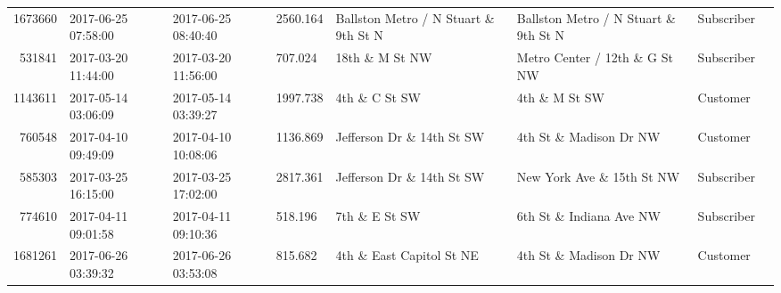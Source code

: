 \documentclass[11pt]{article}
\begin{document}
\begin{description}
\begin{tabular}{r|lllllll}
	 1673660                                            & 2017-06-25 07:58:00                                & 2017-06-25 08:40:40                                & 2560.164                                           & Ballston Metro / N Stuart \& 9th St N             & Ballston Metro / N Stuart \& 9th St N             & Subscriber                                        \\
	  531841                                            & 2017-03-20 11:44:00                                & 2017-03-20 11:56:00                                &  707.024                                           & 18th \& M St NW                                   & Metro Center / 12th \& G St NW                    & Subscriber                                        \\
	 1143611                                            & 2017-05-14 03:06:09                                & 2017-05-14 03:39:27                                & 1997.738                                           & 4th \& C St SW                                    & 4th \& M St SW                                    & Customer                                          \\
	  760548                                            & 2017-04-10 09:49:09                                & 2017-04-10 10:08:06                                & 1136.869                                           & Jefferson Dr \& 14th St SW                        & 4th St \& Madison Dr NW                           & Customer                                          \\
	  585303                                            & 2017-03-25 16:15:00                                & 2017-03-25 17:02:00                                & 2817.361                                           & Jefferson Dr \& 14th St SW                        & New York Ave \& 15th St NW                        & Subscriber                                        \\
	  774610                                            & 2017-04-11 09:01:58                                & 2017-04-11 09:10:36                                &  518.196                                           & 7th \& E St SW                                    & 6th St \& Indiana Ave NW                          & Subscriber                                        \\
	 1681261                                            & 2017-06-26 03:39:32                                & 2017-06-26 03:53:08                                &  815.682                                           & 4th \& East Capitol St NE                         & 4th St \& Madison Dr NW                           & Customer                                          \\

\end{tabular}
\end{description}
\end{document}
